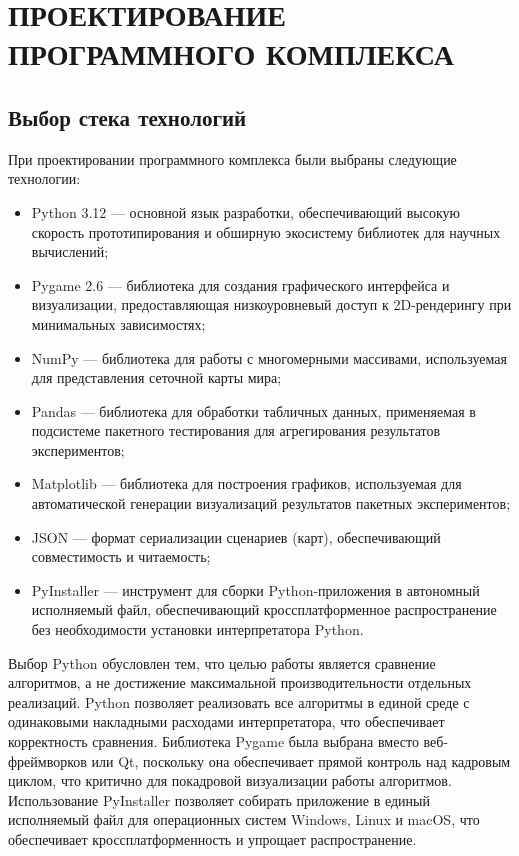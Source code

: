 \section{ПРОЕКТИРОВАНИЕ ПРОГРАММНОГО КОМПЛЕКСА}

\subsection{Выбор стека технологий}

При проектировании программного комплекса были выбраны следующие технологии:

\begin{itemize}
    \item Python 3.12 --- основной язык разработки, обеспечивающий высокую скорость прототипирования и обширную экосистему библиотек для научных вычислений;
    \item Pygame 2.6 --- библиотека для создания графического интерфейса и визуализации, предоставляющая низкоуровневый доступ к 2D-рендерингу при минимальных зависимостях;
    \item NumPy --- библиотека для работы с многомерными массивами, используемая для представления сеточной карты мира;
    \item Pandas --- библиотека для обработки табличных данных, применяемая в подсистеме пакетного тестирования для агрегирования результатов экспериментов;
    \item Matplotlib --- библиотека для построения графиков, используемая для автоматической генерации визуализаций результатов пакетных экспериментов;
    \item JSON --- формат сериализации сценариев (карт), обеспечивающий совместимость и читаемость;
    \item PyInstaller --- инструмент для сборки Python-приложения в автономный исполняемый файл, обеспечивающий кроссплатформенное распространение без необходимости установки интерпретатора Python.
\end{itemize}

Выбор Python обусловлен тем, что целью работы является сравнение алгоритмов, а не достижение максимальной производительности отдельных реализаций. Python позволяет реализовать все алгоритмы в единой среде с одинаковыми накладными расходами интерпретатора, что обеспечивает корректность сравнения. Библиотека Pygame была выбрана вместо веб-фреймворков или Qt, поскольку она обеспечивает прямой контроль над кадровым циклом, что критично для покадровой визуализации работы алгоритмов. Использование PyInstaller позволяет собирать приложение в единый исполняемый файл для операционных систем Windows, Linux и macOS, что обеспечивает кроссплатформенность и упрощает распространение.

